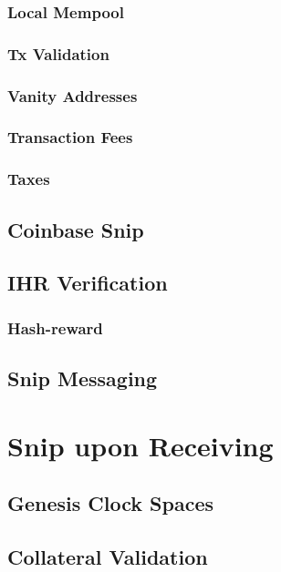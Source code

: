 \documentclass[a4paper,11pt]{article}
\begin{document}
\subsubsection{Local Mempool}

\subsubsection{Tx Validation}

\subsubsection{Vanity Addresses}

\subsubsection{Transaction Fees}

\subsubsection{Taxes}

\subsection{Coinbase Snip}

\subsection{IHR Verification}

\subsubsection{Hash-reward}

\subsection{Snip Messaging}

\section{Snip upon Receiving}

\subsection{Genesis Clock Spaces}

\subsection{Collateral Validation}
\end{document}
